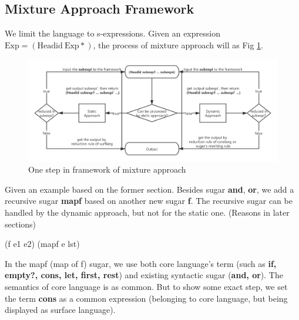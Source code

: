 \subsection{Mixture Approach Framework}
We limit the language to s-expressions. Given an expression $\mbox{Exp} = (\mbox{Headid}~\mbox{Exp}*)$, the process of mixture approach will as Fig \ref{fig:mixture}.

\begin{figure}[t]
	\centering
	\includegraphics[width=12cm]{images/mixture.png}
	\caption{One step in framework of mixture approach}
	\label{fig:mixture}
\end{figure}

Given an example based on the former section. Besides sugar {\bfseries and}, {\bfseries or}, we add a recursive sugar {\bfseries mapf} based on another new sugar {\bfseries f}. The recursive sugar can be handled by the dynamic approach, but not for the static one. (Reasons in later sections)
\begin{Codes}
\small{(f e1 e2)} 
\small{(mapf e lst)}  
\end{Codes}

In the mapf (map of f) sugar, we use both core language's term (such as {\bfseries if, empty?, cons, let, first, rest}) and existing syntactic sugar ({\bfseries and, or}). The semantics of core language is as common. But to show some exact step, we set the term {\bfseries cons} as a common expression (belonging to core language, but being displayed as surface language).


